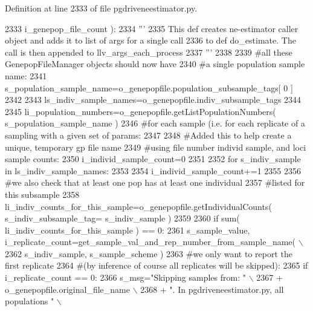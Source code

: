 Definition at line 2333 of file pgdriveneestimator.\+py.


\begin{DoxyCode}
2333                                             i\_genepop\_file\_count ):
2334     \textcolor{stringliteral}{'''     }
2335 \textcolor{stringliteral}{    This def creates ne-estimator caller object and adds it to list of args for a single call}
2336 \textcolor{stringliteral}{    to def do\_estimate.  The call is then appended to llv\_args\_each\_process}
2337 \textcolor{stringliteral}{    '''}
2338 
2339     \textcolor{comment}{#all these GenepopFileManager objects should now have}
2340     \textcolor{comment}{#a single population sample name:}
2341     s\_population\_sample\_name=o\_genepopfile.population\_subsample\_tags[ 0 ]
2342 
2343     ls\_indiv\_sample\_names=o\_genepopfile.indiv\_subsample\_tags
2344 
2345     li\_population\_numbers=o\_genepopfile.getListPopulationNumbers( s\_population\_sample\_name )
2346     \textcolor{comment}{#for each sample (i.e. for each replicate of a sampling with a given set of params:}
2347 
2348     \textcolor{comment}{#Added this to help create a unique, temporary gp file name}
2349     \textcolor{comment}{#using file number individ sample, and loci sample counts:}
2350     i\_individ\_sample\_count=0
2351 
2352     \textcolor{keywordflow}{for} s\_indiv\_sample \textcolor{keywordflow}{in} ls\_indiv\_sample\_names:
2353 
2354         i\_individ\_sample\_count+=1
2355 
2356         \textcolor{comment}{#we also check that at least one pop has at least one individual}
2357         \textcolor{comment}{#listed for this subsample}
2358         li\_indiv\_counts\_for\_this\_sample=o\_genepopfile.getIndividualCounts( s\_indiv\_subsample\_tag=
      s\_indiv\_sample )
2359 
2360         \textcolor{keywordflow}{if} sum( li\_indiv\_counts\_for\_this\_sample ) == 0:
2361             s\_sample\_value, i\_replicate\_count=get\_sample\_val\_and\_rep\_number\_from\_sample\_name( \(\backslash\)
2362                                             s\_indiv\_sample, s\_sample\_scheme )
2363             \textcolor{comment}{#we only want to report the first replicate}
2364             \textcolor{comment}{#(by inference of course all replicates will be skipped):}
2365             \textcolor{keywordflow}{if} i\_replicate\_count == 0:
2366                 s\_msg=\textcolor{stringliteral}{"Skipping samples from: "} \(\backslash\)
2367                         + o\_genepopfile.original\_file\_name \(\backslash\)
2368                         + \textcolor{stringliteral}{".  In pgdriveneestimator.py, all populations "} \(\backslash\)

\end{DoxyCode}

